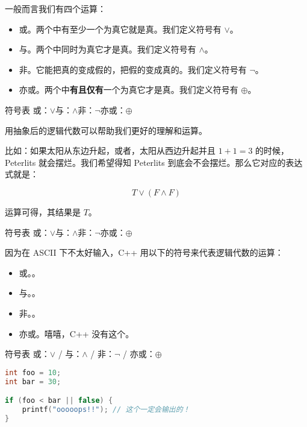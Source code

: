 \begin{frame}
一般而言我们有四个运算：
\begin{itemize}
    \item 或。两个中有至少一个为真它就是真。我们定义符号有 $\lor$。\pause
    \item 与。两个中同时为真它才是真。我们定义符号有 $\land$。\pause
    \item 非。它能把真的变成假的，把假的变成真的。我们定义符号有 $\lnot$。\pause
    \item 亦或。两个中\textbf{有且仅有}一个为真它才是真。我们定义符号有 $\oplus$。
\end{itemize}
\end{frame}

\begin{frame}
\begin{block}{符号表}
或：$\lor$\hfill 与：$\land$\hfill 非：$\lnot$\hfill 亦或：$\oplus$ \hfill
\end{block}

用抽象后的逻辑代数可以帮助我们更好的理解和运算。

比如：如果太阳从东边升起，或者，太阳从西边升起并且 $1 + 1 = 3$ 的时候，Peterlits
就会摆烂。我们希望得知 Peterlits 到底会不会摆烂。那么它对应的表达式就是：\pause

\[T \lor (F \land F)\]

运算可得，其结果是 $T$。
\end{frame}

\begin{frame}
\begin{block}{符号表}
或：$\lor$\hfill 与：$\land$\hfill 非：$\lnot$\hfill 亦或：$\oplus$ \hfill
\end{block}

因为在 ASCII 下不太好输入，C++ 用以下的符号来代表逻辑代数的运算：
\begin{itemize}
    \item 或。\cmd{||}。\pause
    \item 与。\cmd{\&\&}。\pause
    \item 非。\cmd{!}。\pause
    \item 亦或。嘻嘻，C++ 没有这个。
\end{itemize}
\end{frame}

\begin{frame}[fragile]
\begin{block}{符号表}
或：$\lor$ / \cmd{||}\hfill
与：$\land$ / \cmd{\&\&}\hfill
非：$\lnot$ / \cmd{!}\hfill
亦或：$\oplus$ \hfill
\end{block}

\begin{lstlisting}[language=C++]
int foo = 10;
int bar = 30;

if (foo < bar || false) {
    printf("ooooops!!"); // 这个一定会输出的！
}
\end{lstlisting}
\end{frame}

